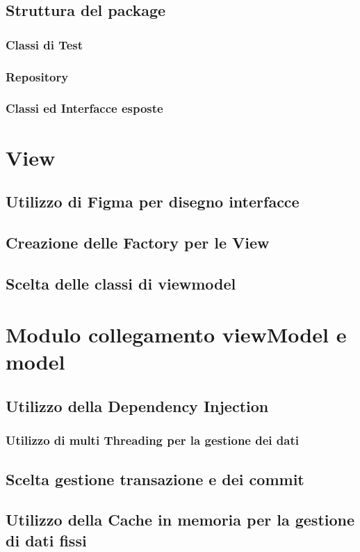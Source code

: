 \documentclass[12pt, a4paper]{article}
\begin{document}
\subsection{Struttura del package}
\subsubsection{Classi di Test}
\subsubsection{Repository}
\subsubsection{Classi ed Interfacce esposte}

\newpage
\section{View}
\subsection{Utilizzo di Figma per disegno interfacce}
\subsection{Creazione delle Factory per le View}
\subsection{Scelta delle classi di viewmodel}

\newpage
\section{Modulo collegamento viewModel e model}
\subsection{Utilizzo della Dependency Injection}
\subsubsection{Utilizzo di multi Threading per la gestione dei dati}
\subsection{Scelta gestione transazione e dei commit}
\subsection{Utilizzo della Cache in memoria per la gestione di dati fissi}
\end{document}
